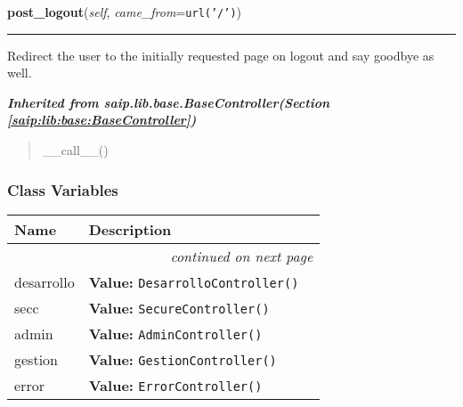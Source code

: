     \label{saip:controllers:root:RootController:post_logout}

    \vspace{0.5ex}

\hspace{.8\funcindent}\begin{boxedminipage}{\funcwidth}

    \raggedright \textbf{post\_logout}(\textit{self}, \textit{came\_from}={\tt url('/')})

    \vspace{-1.5ex}

    \rule{\textwidth}{0.5\fboxrule}
\setlength{\parskip}{2ex}
    Redirect the user to the initially requested page on logout and say 
    goodbye as well.

\setlength{\parskip}{1ex}
    \end{boxedminipage}


\large{\textbf{\textit{Inherited from saip.lib.base.BaseController\textit{(Section \ref{saip:lib:base:BaseController})}}}}

\begin{quote}
\_\_call\_\_()
\end{quote}


  \subsubsection{Class Variables}

    \vspace{-1cm}
\hspace{\varindent}\begin{longtable}{|p{\varnamewidth}|p{\vardescrwidth}|l}
\cline{1-2}
\cline{1-2} \centering \textbf{Name} & \centering \textbf{Description}& \\
\cline{1-2}
\endhead\cline{1-2}\multicolumn{3}{r}{\small\textit{continued on next page}}\\\endfoot\cline{1-2}
\endlastfoot\raggedright d\-e\-s\-a\-r\-r\-o\-l\-l\-o\- & \raggedright \textbf{Value:} 
{\tt DesarrolloController()}&\\
\cline{1-2}
\raggedright s\-e\-c\-c\- & \raggedright \textbf{Value:} 
{\tt SecureController()}&\\
\cline{1-2}
\raggedright a\-d\-m\-i\-n\- & \raggedright \textbf{Value:} 
{\tt AdminController()}&\\
\cline{1-2}
\raggedright g\-e\-s\-t\-i\-o\-n\- & \raggedright \textbf{Value:} 
{\tt GestionController()}&\\
\cline{1-2}
\raggedright e\-r\-r\-o\-r\- & \raggedright \textbf{Value:} 
{\tt ErrorController()}&\\
\cline{1-2}
\end{longtable}

